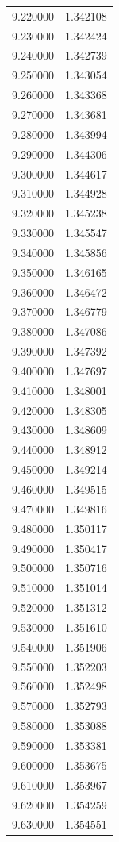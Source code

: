 \begin{tabular}{rr}
9.220000 & 1.342108 \\
9.230000 & 1.342424 \\
9.240000 & 1.342739 \\
9.250000 & 1.343054 \\
9.260000 & 1.343368 \\
9.270000 & 1.343681 \\
9.280000 & 1.343994 \\
9.290000 & 1.344306 \\
9.300000 & 1.344617 \\
9.310000 & 1.344928 \\
9.320000 & 1.345238 \\
9.330000 & 1.345547 \\
9.340000 & 1.345856 \\
9.350000 & 1.346165 \\
9.360000 & 1.346472 \\
9.370000 & 1.346779 \\
9.380000 & 1.347086 \\
9.390000 & 1.347392 \\
9.400000 & 1.347697 \\
9.410000 & 1.348001 \\
9.420000 & 1.348305 \\
9.430000 & 1.348609 \\
9.440000 & 1.348912 \\
9.450000 & 1.349214 \\
9.460000 & 1.349515 \\
9.470000 & 1.349816 \\
9.480000 & 1.350117 \\
9.490000 & 1.350417 \\
9.500000 & 1.350716 \\
9.510000 & 1.351014 \\
9.520000 & 1.351312 \\
9.530000 & 1.351610 \\
9.540000 & 1.351906 \\
9.550000 & 1.352203 \\
9.560000 & 1.352498 \\
9.570000 & 1.352793 \\
9.580000 & 1.353088 \\
9.590000 & 1.353381 \\
9.600000 & 1.353675 \\
9.610000 & 1.353967 \\
9.620000 & 1.354259 \\
9.630000 & 1.354551 \\

\end{tabular}
